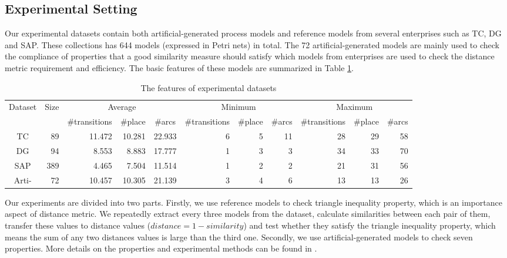 \documentclass{llncs}
\begin{document}
\subsection{Experimental Setting}
Our experimental datasets contain both artificial-generated process models and reference models from several enterprises such as TC, DG and SAP. These collections has 644 models (expressed in Petri nets) in total. The 72 artificial-generated models are mainly used to check the compliance of properties that a good similarity measure should satisfy which models from enterprises are used to check the distance metric requirement and efficiency. The basic features of these models are summarized in Table \ref{tab:datasets}.

\begin{table}[ht]
\centering
\caption{The features of experimental datasets\label{tab:datasets}}
\scriptsize
\begin{tabular}{|c|r|r|r|r|r|r|r|r|r|r|} \hline
	\multicolumn{1}{|c|}{\multirow{2}{*}{Dataset}} & \multicolumn{1}{c|}{\multirow{2}{*}{Size}} & \multicolumn{3}{|c}{Average} & \multicolumn{3}{|c}{Minimum} & \multicolumn{3}{|c|}{Maximum}\\ \cline{3-11}
	\multicolumn{1}{|c|}{} & \multicolumn{1}{c|}{} & \multicolumn{1}{c|}{\#transitions} & \multicolumn{1}{c|}{\#place} & \multicolumn{1}{c|}{\#arcs} & \multicolumn{1}{c|}{\#transitions} & \multicolumn{1}{c|}{\#place} & \multicolumn{1}{c|}{\#arcs} & \multicolumn{1}{c|}{\#transitions} & \multicolumn{1}{c|}{\#place} & \multicolumn{1}{c|}{\#arcs}\\ \hline
	TC & 89 & 11.472 & 10.281 & 22.933 & 6 & 5 & 11 & 28 & 29 & 58 \\ \hline
	DG & 94 & 8.553 & 8.883 & 17.777 & 1 & 3 & 3 & 34 & 33 & 70 \\ \hline
	SAP & 389 & 4.465 & 7.504 & 11.514 & 1 & 2 & 2 & 21 & 31 & 56 \\ \hline
	Arti- & 72 & 10.457 & 10.305 & 21.139 & 3 & 4 & 6 & 13 & 13 & 26 \\ \hline
\end{tabular}
\end{table}

Our experiments are divided into two parts. Firstly, we use reference models to check triangle inequality property, which is an importance aspect of distance metric. We repeatedly extract every three models from the dataset, calculate similarities between each pair of them, transfer these values to distance values ($distance=1-similarity$) and test whether they satisfy the triangle inequality property, which means the sum of any two distances values is large than the third one. Secondly, we use artificial-generated models to check seven properties. More details on the properties and experimental methods can be found in \cite{wang2013ssdt,wang2014tager,wang2015tar++}.
\end{document}
